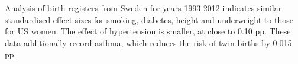 \documentclass{nature}
\begin{document}
\begin{linenumbers}

Analysis of birth registers from Sweden for years 1993-2012 indicates similar standardised effect sizes for smoking, diabetes, height and underweight to those for US women. The effect of hypertension is smaller, at close to 0.10 pp. These data additionally record asthma, which reduces the risk of twin births by 0.015 pp. %



\end{linenumbers}
\end{document}
